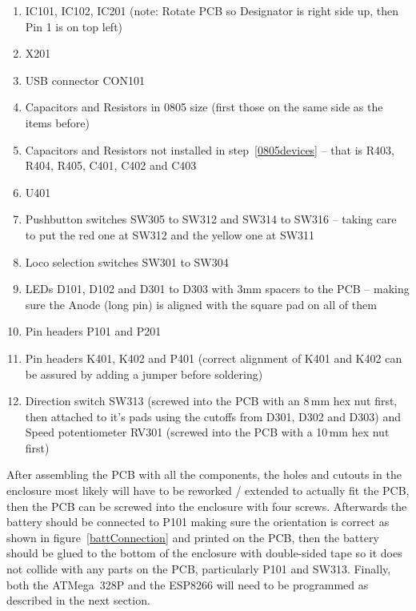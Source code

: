\documentclass[11pt,a4paper]{scrartcl}
\begin{document}
\begin{enumerate}
\item IC101, IC102, IC201 (note: Rotate PCB so Designator is right side up, then Pin 1 is on top left)
\item X201
\item USB connector CON101
\item Capacitors and Resistors in 0805 size (first those on the same side as the items before) \label{0805devices}
\item Capacitors and Resistors not installed in step~\ref{0805devices} -- that is R403, R404, R405, C401, C402 and C403
\item U401
\item Pushbutton switches SW305 to SW312 and SW314 to SW316 -- taking care to put the red one at SW312 and the yellow one at SW311
\item Loco selection switches SW301 to SW304
\item LEDs D101, D102 and D301 to D303 with 3mm spacers to the PCB -- making sure the Anode (long pin) is aligned with the square pad on all of them
\item Pin headers P101 and P201
\item Pin headers K401, K402 and P401 (correct alignment of K401 and K402 can be assured by adding a jumper before soldering)
\item Direction switch SW313 (screwed into the PCB with an 8\,mm hex nut first, then attached to it's pads using the cutoffs from D301, D302 and D303) and Speed potentiometer RV301 (screwed into the PCB with a 10\,mm hex nut first)
\end{enumerate}

After assembling the PCB with all the components, the holes and cutouts in the enclosure most likely will have to be reworked / extended to actually fit the PCB, then the PCB can be screwed into the enclosure with four screws. Afterwards the battery should be connected to P101 making sure the orientation is correct as shown in figure~\ref{battConnection} and printed on the PCB, then the battery should be glued to the bottom of the enclosure with double-sided tape so it does not collide with any parts on the PCB, particularly P101 and SW313. Finally, both the ATMega~328P and the ESP8266 will need to be programmed as described in the next section.
\end{document}
